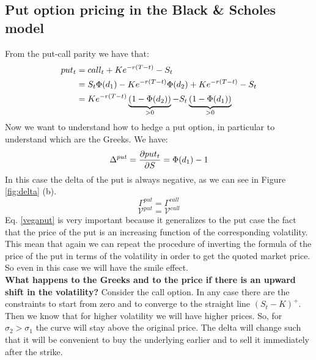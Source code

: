 \subsection{Put option pricing in the Black \& Scholes model}
From the put-call parity we have that:
\begin{align}
    \notag put_t &= call_t + Ke^{-r(T-t)} - S_t \\
    &=
    \notag S_t\Phi(d_1) - Ke^{-r(T-t)}\Phi(d_2) + Ke^{-r(T-t)} - S_t \\ 
    &=
    Ke^{-r(T-t)}\underbrace{(1-\Phi(d_2))}_{>0} - S_t\underbrace{(1-\Phi(d_1))}_{>0}
\end{align}
Now we want to understand how to hedge a put option, in particular to understand which are the Greeks. We have:
\begin{equation}
    \Delta^{put} = \pdv{put_t}{S} = \Phi(d_1)-1
\end{equation}
In this case the delta of the put is always negative, as we can see in Figure \ref{fig:delta} (b).
\begin{equation}
    \Gamma^{put} = \Gamma^{call}
\end{equation}
\begin{equation}\label{vegaput}
    \mathcal{V}^{put} = \mathcal{V}^{call}
\end{equation}
Eq. \eqref{vegaput} is very important because it generalizes to the put case the fact that the price of the put is an increasing function of the corresponding volatility. This mean that again we can repeat the procedure of inverting the formula of the price of the put in terms of the volatility in order to get the quoted market price. So even in this case we will have the smile effect.\\
\textbf{What happens to the Greeks and to the price if there is an upward shift in the volatility?} Consider the call option. In any case there are the constraints to start from zero and to converge to the straight line $(S_t-K)^+$. Then we know that for higher volatility we will have higher prices. So, for $\sigma_2>\sigma_1$ the curve will stay above the original price.
The delta will change such that it will be convenient to buy the underlying earlier and to sell it immediately after the strike.
